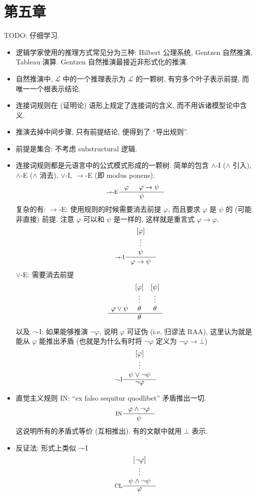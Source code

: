 \documentclass[a4paper]{article}
\begin{document}
\section{第五章}
    TODO: 仔细学习.
\begin{itemize}
    \item 逻辑学家使用的推理方式常见分为三种: Hilbert 公理系统, Gentzen 自然推演, Tableau 演算.
        Gentzen 自然推演最接近非形式化的推演.
    \item 自然推演中, $\mathcal{L}$ 中的一个推理表示为 $\mathcal{L}$ 的一颗树,
        有穷多个叶子表示前提, 而唯一一个根表示结论.
    \item 连接词规则在 (证明论) 语形上规定了连接词的含义, 而不用诉诸模型论中含义.
    \item 推演去掉中间步骤, 只有前提结论, 便得到了 ``导出规则''.

    \item 前提是集合: 不考虑 substructural 逻辑.

    \item 连接词规则都是元语言中的公式模式形成的一颗树.
        简单的包含 $\land$-I ($\land$ 引入), $\land$-E ($\land$ 消去), $\lor$-I, $\to$-E (即 modus ponens).
        \[
            \inference[$\to$-E]
                {\varphi & \varphi \to \psi}
                {\psi}
            \]
        复杂的有: $\to$-E: 使用规则的时候需要消去前提 $\varphi$, 而且要求 $\varphi$ 是 $\psi$ 的 (可能非直接) 前提. 注意 $\varphi$ 可以和 $\psi$ 是一样的, 这样就是重言式 $\varphi \to \varphi$.
        \[
            \inference[$\to$-I]
                {[\varphi]\\ \vdots \\ \psi}
                {\varphi \to \psi}
        \]
        $\lor$-E: 需要消去前提
        \[
            \begin{matrix}
                 & [\varphi] & [\psi] \\
                 & \vdots & \vdots \\
                 \varphi \lor \psi & \theta & \theta \\
                 \hline
                 & \theta &
            \end{matrix}
        \]
        以及 $\lnot$-I: 如果能够推演 $\lnot \varphi$, 说明 $\varphi$ 可证伪 (i.e. 归谬法 RAA), 这里认为就是能从 $\varphi$ 能推出矛盾 (也就是为什么有时将 $\lnot \varphi$ 定义为 $\lnot \varphi\to \bot$)
        \[
            \inference[$\lnot$-I]{
                [\varphi] \\ \vdots \\ \psi \lor \lnot \psi
            }{
                \lnot \varphi
            }
        \]
    \item 直觉主义规则 IN: ``ex falso sequitur quodlibet'' 矛盾推出一切.
        \[
            \inference[IN]
                {\varphi \land \lnot \varphi}
                {\psi}
            \]
        这说明所有的矛盾式等价 (互相推出). 有的文献中就用 $\bot$ 表示.
    \item 反证法: 形式上类似 $\lnot$-I
        \[
            \inference[CL]
                {[\lnot \varphi] \\ \vdots \\ \psi \land \lnot \psi}
                {\varphi}
            \]


\end{itemize}
\end{document}
